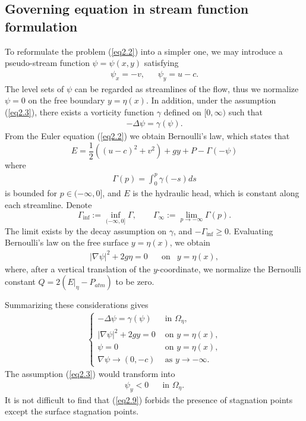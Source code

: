 \documentclass[11pt,reqno]{amsart}
\numberwithin{equation}{section}
\theoremstyle{definition}
\theoremstyle{remark}
\begin{document}
\subsection{Governing equation in stream function formulation}
 To reformulate the problem (\ref{eq2.2}) into a simpler one, we may introduce a pseudo-stream function $\psi=\psi(x,y)$ satisfying
\begin{eqnarray}
\psi_{x}=-v, ~~~~~~~\psi_{y}=u-c. \label{eq2.4}
\end{eqnarray}
The level sets of $\psi$ can be regarded as streamlines of the flow,
thus we normalize $\psi=0$ on the free boundary $y=\eta(x)$.
In addition, under the assumption
(\ref{eq2.3}), there exists a vorticity function $\gamma$ defined on
$[0, \infty)$ such that
\begin{eqnarray}
-\Delta \psi=\gamma(\psi).  \label{eq2.5}
\end{eqnarray}
From the Euler equation (\ref{eq2.2}) we obtain Bernoulli's law,
which states that
$$
E=\frac{1}{2}((u-c)^{2}+v^{2})+gy+P-\Gamma(-\psi)
$$
where
\begin{eqnarray}
 \Gamma(p)=\int^p_0 \gamma(-s)ds \label{eq2.6}
 \end{eqnarray}
is bounded for $p\in(-\infty,0]$, and $E$ is the hydraulic head,
which is constant along each streamline. Denote
$$
\Gamma_{\inf}:=\inf_{(-\infty,0]}\Gamma, \qquad
\Gamma_{\infty}:=\lim_{p\to-\infty}\Gamma(p).
$$
The limit exists by the decay assumption on $\gamma$, and
$-\Gamma_{\inf}\geq0$. Evaluating
Bernoulli's law on the free surface $y=\eta(x)$, we obtain
\begin{eqnarray}
|\nabla\psi|^{2}+2g\eta=0~~~~~~\text { on }~~y=\eta(x),
\label{eq2.7}
\end{eqnarray}
where, after a vertical translation of the $y$-coordinate, we
normalize the Bernoulli constant
$Q=2(E|_{\eta}-P_{atm})$ to be zero.

Summarizing these considerations gives
\begin{eqnarray}
\left\{\begin{array}{ll}{- \Delta\psi=\gamma(\psi)} & {\text { in } \Omega_{\eta}}, \\
{|\nabla\psi|^{2}+2gy=0} & { \text { on } y=\eta(x)}, \\
{\psi=0} & {\text { on } y=\eta(x)}, \\
{\nabla\psi\rightarrow (0,-c)} & {\text { as } y\rightarrow
-\infty}.\end{array}\right. \label{eq2.8}
\end{eqnarray}
The assumption (\ref{eq2.3}) would transform into
\begin{eqnarray}
\psi_{y}<0~~~~~~\text { in } \Omega_{\eta}. \label{eq2.9}
\end{eqnarray}
It is not difficult to find that (\ref{eq2.9}) forbids the presence
of stagnation points except the surface stagnation points.
\end{document}
